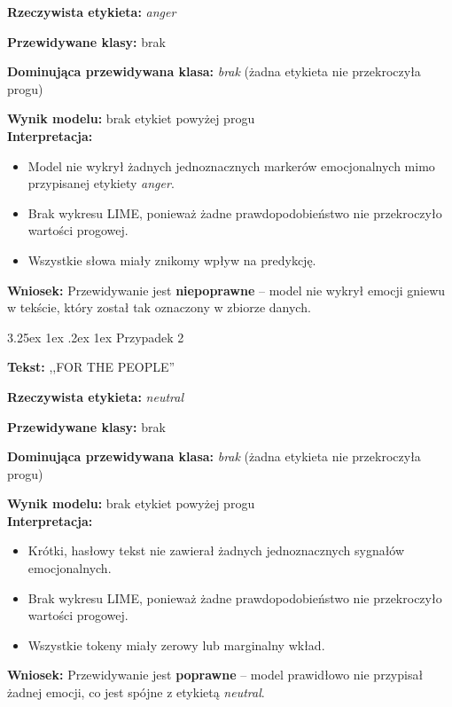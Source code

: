 \documentclass[wmii, inf, mgr]{uwmthesis}
\makeatletter
\renewcommand\paragraph{\@startsection{paragraph}{4}{\z@}%
  {3.25ex \@plus1ex \@minus.2ex}%
  {1ex}%
  {\normalfont\normalsize\bfseries}}
\makeatother
\begin{document}
\textbf{Rzeczywista etykieta:} \textit{anger}

\textbf{Przewidywane klasy:} brak

\textbf{Dominująca przewidywana klasa:} \textit{brak} (żadna etykieta nie przekroczyła progu)

\textbf{Wynik modelu:} brak etykiet powyżej progu\\[2mm]

\textbf{Interpretacja:}
\begin{itemize}
	\item Model nie wykrył żadnych jednoznacznych markerów emocjonalnych mimo przypisanej etykiety \textit{anger}.
	\item Brak wykresu LIME, ponieważ żadne prawdopodobieństwo nie przekroczyło wartości progowej.
	\item Wszystkie słowa miały znikomy wpływ na predykcję.
\end{itemize}

\textbf{Wniosek:} Przewidywanie jest \textbf{niepoprawne} -- model nie wykrył emocji gniewu w tekście, który został tak oznaczony w zbiorze danych.


\paragraph{Przypadek 2}

\textbf{Tekst:} ,,FOR THE PEOPLE''

\textbf{Rzeczywista etykieta:} \textit{neutral}

\textbf{Przewidywane klasy:} brak

\textbf{Dominująca przewidywana klasa:} \textit{brak} (żadna etykieta nie przekroczyła progu)

\textbf{Wynik modelu:} brak etykiet powyżej progu\\[2mm]

\textbf{Interpretacja:}
\begin{itemize}
	\item Krótki, hasłowy tekst nie zawierał żadnych jednoznacznych sygnałów emocjonalnych.
	\item Brak wykresu LIME, ponieważ żadne prawdopodobieństwo nie przekroczyło wartości progowej.
	\item Wszystkie tokeny miały zerowy lub marginalny wkład.
\end{itemize}

\textbf{Wniosek:} Przewidywanie jest \textbf{poprawne} -- model prawidłowo nie przypisał żadnej emocji, co jest spójne z etykietą \textit{neutral}.
\end{document}
